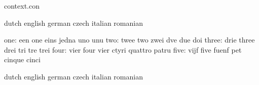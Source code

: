 



\startlogginginterface context.con



\startvariables            dutch                     english
                           german                    czech
                           italian                   romanian

                      one: een                       one
                           eins                      jedna
                           uno                       unu
                      two: twee                      two
                           zwei                      dve
                           due                       doi
                    three: drie                      three
                           drei                      tri
                           tre                       trei
                     four: vier                      four
                           vier                      ctyri
                           quattro                   patru
                     five: vijf                      five
                           fuenf                     pet
                           cinque                    cinci
\stopvariables




\startvariables            dutch                     english
                           german                    czech
                           italian                   romanian


